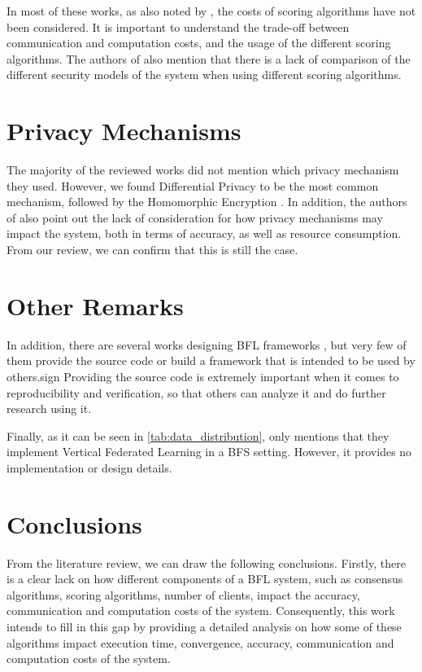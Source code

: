 In most of these works, as also noted by \cite{9403374, 10.48550/arxiv.2110.02182}, the costs of scoring algorithms have not been considered. It is important to understand the trade-off between communication and computation costs, and the usage of the different scoring algorithms. The authors of \cite{10.48550/arxiv.2110.02182} also mention that there is a lack of comparison of the different security models of the system when using different scoring algorithms.

\section{Privacy Mechanisms}\label{related_work:privacy}

The majority of the reviewed works did not mention which privacy mechanism they used. However, we found Differential Privacy \cite{10.48550/arxiv.2007.03856, Peyvandi2022, 9170559} to be the most common mechanism, followed by the Homomorphic Encryption \cite{8945913, 8894364}. In addition, the authors of \cite{9403374} also point out the lack of consideration for how privacy mechanisms may impact the system, both in terms of accuracy, as well as resource consumption. From our review, we can confirm that this is still the case.

\section{Other Remarks}\label{related_work:other_remarks}

In addition, there are several works designing BFL frameworks \cite{10.1145/3422337.3447837, 8945913, 10.48550/arxiv.1910.12603, 10.48550/arxiv.2110.02182}, but very few of them provide the source code or build a framework that is intended to be used by others.sign Providing the source code is extremely important when it comes to reproducibility and verification, so that others can analyze it and do further research using it.

Finally, as it can be seen in \autoref{tab:data_distribution}, only \cite{10.48550/arxiv.1912.04859} mentions that they implement Vertical Federated Learning in a BFS setting. However, it provides no implementation or design details.

\section{Conclusions}\label{related_work:conclusions}

From the literature review, we can draw the following conclusions. Firstly, there is a clear lack on how different components of a BFL system, such as consensus algorithms, scoring algorithms, number of clients, impact the accuracy, communication and computation costs of the system. Consequently, this work intends to fill in this gap by providing a detailed analysis on how some of these algorithms impact execution time, convergence, accuracy, communication and computation costs of the system.

